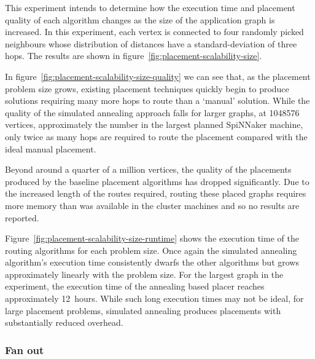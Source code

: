 				This experiment intends to determine how the execution time and
				placement quality of each algorithm changes as the size of the
				application graph is increased. In this experiment, each vertex is
				connected to four randomly picked neighbours whose distribution of
				distances have a standard-deviation of three hops. The results are
				shown in figure~\ref{fig:placement-scalability-size}.
				
				In figure~\ref{fig:placement-scalability-size-quality} we can see that,
				as the placement problem size grows, existing placement techniques
				quickly begin to produce solutions requiring many more hops to route
				than a `manual' solution. While the quality of the simulated annealing
				approach falls for larger graphs, at \num{1048576} vertices,
				approximately the number in the largest planned SpiNNaker machine, only
				twice as many hops are required to route the placement compared with
				the ideal manual placement.
				
				Beyond around a quarter of a million vertices, the quality of the
				placements produced by the baseline placement algorithms has dropped
				significantly. Due to the increased length of the routes required,
				routing these placed graphs requires more memory than was available in
				the cluster machines and so no results are reported.
				
				Figure~\ref{fig:placement-scalability-size-runtime} shows the execution
				time of the routing algorithms for each problem size. Once again the
				simulated annealing algorithm's execution time consistently dwarfs the
				other algorithms but grows approximately linearly with the problem
				size. For the largest graph in the experiment, the execution time of
				the annealing based placer reaches approximately 12~hours. While such
				long execution times may not be ideal, for large placement problems,
				simulated annealing produces placements with substantially reduced
				overhead.
			
			\subsubsection{Fan out}
			
